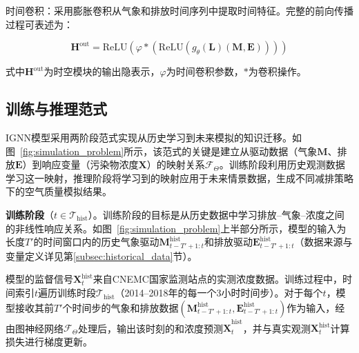时间卷积：采用膨胀卷积从气象和排放时间序列中提取时间特征。完整的前向传播过程可表述为：

\begin{equation}
\mathbf{H}^{\text{out}} = \text{ReLU}\left(\varphi * \left(\text{ReLU}\left(g_{\theta}(\mathbf{L})(\mathbf{M}, \mathbf{E})\right)\right)\right)
\label{eq:temporal_conv}
\end{equation}

\noindent 式中$\mathbf{H}^{\text{out}}$为时空模块的输出隐表示，$\varphi$为时间卷积参数，$*$为卷积操作。


\subsection{训练与推理范式}
\label{subsec:train_infer_paradigm}

IGNN模型采用两阶段范式实现从历史学习到未来模拟的知识迁移。如图~\ref{fig:simulation_problem}所示，该范式的关键是建立从驱动数据（气象$\mathbf{M}$、排放$\mathbf{E}$）到响应变量（污染物浓度$\mathbf{X}$）的映射关系$\mathcal{F}_\Theta$。训练阶段利用历史观测数据学习这一映射，推理阶段将学习到的映射应用于未来情景数据，生成不同减排策略下的空气质量模拟结果。

\textbf{训练阶段}（$t \in \mathcal{T}_{\text{hist}}$）。训练阶段的目标是从历史数据中学习排放--气象--浓度之间的非线性响应关系。如图~\ref{fig:simulation_problem}上半部分所示，模型的输入为长度$T'$的时间窗口内的历史气象驱动$\mathbf{M}^{\text{hist}}_{t-T'+1:t}$和排放驱动$\mathbf{E}^{\text{hist}}_{t-T'+1:t}$（数据来源与变量定义详见第\ref{subsec:historical_data}节）。

模型的监督信号$\mathbf{X}^{\text{hist}}_{t}$来自CNEMC国家监测站点的实测浓度数据。训练过程中，时间索引$t$遍历训练时段$\mathcal{T}_{\text{hist}}$（2014--2018年的每一个3小时时间步）。对于每个$t$，模型接收其前$T'$个时间步的气象和排放数据$(\mathbf{M}^{\text{hist}}_{t-T'+1:t}, \mathbf{E}^{\text{hist}}_{t-T'+1:t})$作为输入，经由图神经网络$\mathcal{F}_\Theta$处理后，输出该时刻的\PM 和\ozone 浓度预测$\hat{\mathbf{X}}^{\text{hist}}_t$，并与真实观测$\mathbf{X}^{\text{hist}}_t$计算损失进行梯度更新。

